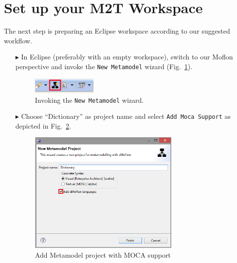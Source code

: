 \section{Set up your M2T Workspace}

The next step is preparing an Eclipse workspace according to our suggested workflow.

\begin{enumerate}
\item[$\blacktriangleright$] In Eclipse (preferably with an empty workspace), switch to our Moflon perspective and invoke the \texttt{New Metamodel} wizard (Fig.~\ref{fig:moca-1-NewMetamodelWizard}). 

\begin{figure}[!htbp]
\begin{center}
 \includegraphics[width=0.3\textwidth]{pics/moca/1DictionaryMetaModel/1-NewMetamodelWizard}
  \caption{Invoking the \texttt{New Metamodel} wizard.}
  \label{fig:moca-1-NewMetamodelWizard}
\end{center}
\end{figure}

\item[$\blacktriangleright$] Choose ``Dictionary'' as project name and select \texttt{Add Moca Support} as depicted in Fig.~\ref{fig:moca-2-AddMocaSupport-ProjectName}. 

\begin{figure}[!htbp]
\begin{center}
 \includegraphics[width=0.7\textwidth]{pics/moca/1DictionaryMetaModel/2-AddMocaSupport-ProjectName}
  \caption{Add Metamodel project with MOCA support}
  \label{fig:moca-2-AddMocaSupport-ProjectName}
\end{center}
\end{figure}


\end{enumerate}
